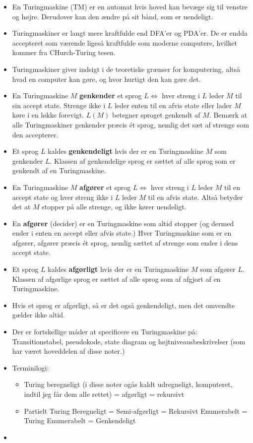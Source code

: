 \begin{itemize}
  \item En Turingmaskine (TM) er en automat hvis hoved kan bevæge sig til venstre og højre. Derudover kan den ændre på sit bånd, som er uendeligt.
  \item Turingmaskiner er langt mere kraftfulde end DFA'er og PDA'er. De er endda accepteret som værende ligeså kraftfulde som moderne computere, hvilket kommer fra CHurch-Turing tesen.
  \item Turingmaskiner giver indsigt i de teoretiske grænser for komputering, altså hvad en computer kan gøre, og hvor hurtigt den kan gøre det.
  \item En Turingmaskine $M$ \textbf{genkender} et sprog $L \iff$ hver streng i $L$ leder $M$ til sin accept state. Strenge ikke i $L$ leder enten til en afvis state eller lader $M$ køre i en løkke forevigt. $L(M)$ betegner sproget genkendt af $M$. Bemærk at alle Turingmaskiner genkender præcis ét sprog, nemlig det sæt af strenge som den accepterer.
  \item Et sprog $L$ kaldes \textbf{genkendeligt} hvis der er en Turingmaskine $M$ som genkender $L$. Klassen af genkendelige sprog er sættet af alle sprog som er genkendt af en Turingmaskine.
  \item En Turingmaskine $M$ \textbf{afgører} et sprog $L \iff$ hver streng i $L$ leder $M$ til en accept state og hver streng ikke i $L$ leder $M$ til en afvis state. Altså betyder det at $M$ stopper på alle strenge, og ikke kører uendeligt.
  \item En \textbf{afgører} (decider) er en Turingmaskine som altid stopper (og dermed ender i enten en accept eller afvis state.) Hver Turingmaskine som er en afgører, afgører præcis ét sprog, nemlig sættet af strenge som ender i dens accept state.
  \item Et sprog $L$ kaldes \textbf{afgørligt} hvis der er en Turingmaskine $M$ som afgører $L$. Klassen af afgørlige sprog er sættet af alle sprog som af afgjort af en Turingmaskine.
  \item Hvis et sprog er afgørligt, så er det også genkendeligt, men det omvendte gælder ikke altid.
  \item Der er fortskellige måder at specificere en Turingmaskine på: Transitionstabel, pseudokode, state diagram og højtniveausbeskrivelser (som har været hoveddelen af disse noter.)
  \item Terminilogi:
		\begin{itemize}
		  \item Turing beregneligt (i disse noter ogås kaldt udregneligt, komputeret, indtil jeg får dem alle rettet) = afgørligt = rekursivt
		  \item Partielt Turing Beregneligt = Semi-afgørligt = Rekursivt Enumerabelt = Turing Enumerabelt = Genkendeligt
		\end{itemize}
  \item
\end{itemize}











